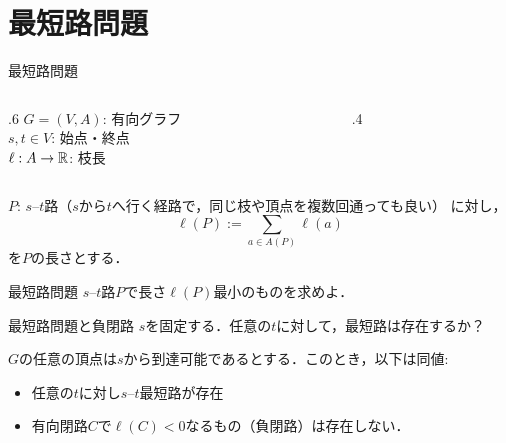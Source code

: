 \documentclass[14pt,aspectratio=169,xcolor=dvipsnames,table,onlytextwidth,dvipdfmx]{beamer}
\begin{document}
\section{最短路問題}
\begin{frame}{最短路問題}
    \begin{columns}[T]
    \begin{column}{.6\textwidth}
        $G = (V, A)$: 有向グラフ \\
        $s, t \in V$: 始点・終点 \\
        $\ell: A \to \mathbb{R}$: 枝長
    \end{column}
    \begin{column}{.4\textwidth}
        \small
        \vspace{-1em}
    \end{column}
    \end{columns}
     \bigskip
     $P$: $s$--$t$路（{\small $s$から$t$へ行く経路で，同じ枝や頂点を複数回通っても良い}） に対し，
     \[
        \ell(P) := \sum_{a \in A(P)} \ell(a)
     \]
     を$P$の長さとする．
     
     \bigskip
     \begin{block}{最短路問題}
        $s$--$t$路$P$で長さ$\ell(P)$最小のものを求めよ．
     \end{block} 
\end{frame}

\begin{frame}{最短路問題と負閉路}
    $s$を固定する．任意の$t$に対して，最短路は存在するか？

   
    \bigskip
    \begin{lemma}
        $G$の任意の頂点は$s$から到達可能であるとする．このとき，以下は同値:  
        \begin{itemize}
            \item 任意の$t$に対し$s$--$t$最短路が存在 
            \item 有向閉路$C$で$\ell(C) < 0$なるもの（\alert{負閉路}）は存在しない．
        \end{itemize}
    \end{lemma}
\end{frame}
\end{document}
